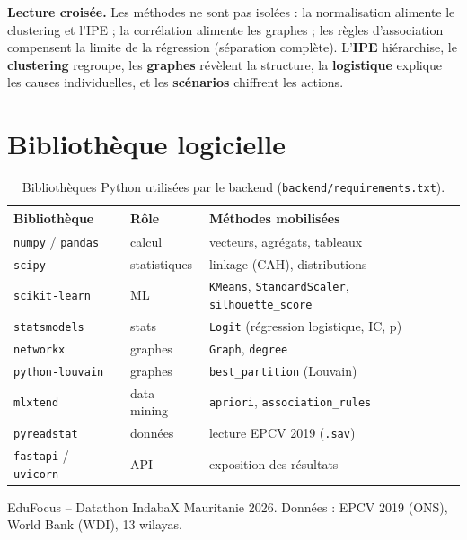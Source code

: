 \documentclass[11pt,a4paper]{article}
\newcommand{\txt}[1]{\texttt{#1}}
\begin{document}
\begin{notebox}
\textbf{Lecture croisée.} Les méthodes ne sont pas isolées : la normalisation
alimente le clustering et l'IPE ; la corrélation alimente les graphes ; les
règles d'association compensent la limite de la régression (séparation
complète). L'\textbf{IPE} hiérarchise, le \textbf{clustering} regroupe,
les \textbf{graphes} révèlent la structure, la \textbf{logistique} explique
les causes individuelles, et les \textbf{scénarios} chiffrent les actions.
\end{notebox}

\section{Bibliothèque logicielle}

\begin{table}[h!]
\centering
\small
\begin{tabularx}{\textwidth}{@{}l l X@{}}
\toprule
\textbf{Bibliothèque} & \textbf{Rôle} & \textbf{Méthodes mobilisées} \\
\midrule
\texttt{numpy} / \texttt{pandas} & calcul & vecteurs, agrégats, tableaux \\
\texttt{scipy} & statistiques & linkage (CAH), distributions \\
\texttt{scikit-learn} & ML & \texttt{KMeans}, \texttt{StandardScaler},
\texttt{silhouette\_score} \\
\texttt{statsmodels} & stats & \texttt{Logit} (régression logistique, IC, p) \\
\texttt{networkx} & graphes & \texttt{Graph}, \texttt{degree} \\
\texttt{python-louvain} & graphes & \texttt{best\_partition} (Louvain) \\
\texttt{mlxtend} & data mining & \texttt{apriori}, \texttt{association\_rules} \\
\texttt{pyreadstat} & données & lecture EPCV 2019 (\texttt{.sav}) \\
\texttt{fastapi} / \texttt{uvicorn} & API & exposition des résultats \\
\bottomrule
\end{tabularx}
\caption{Bibliothèques Python utilisées par le backend (\txt{backend/requirements.txt}).}
\end{table}

\vspace{0.8cm}
\begin{center}
\small\color{eduMute}
EduFocus -- Datathon IndabaX Mauritanie 2026. Données : EPCV 2019 (ONS),
World Bank (WDI), 13 wilayas.
\end{center}
\end{document}
